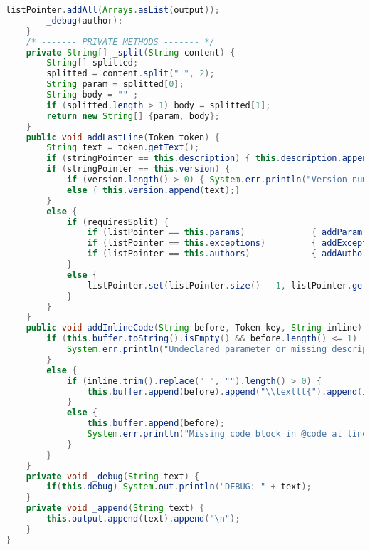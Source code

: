 \begin{lstlisting}[language=Java]
        listPointer.addAll(Arrays.asList(output));
        _debug(author);
    }
    /* ------- PRIVATE METHODS ------- */
    private String[] _split(String content) {
        String[] splitted;
        splitted = content.split(" ", 2);
        String param = splitted[0];
        String body = "" ;
        if (splitted.length > 1) body = splitted[1];
        return new String[] {param, body};
    }
    public void addLastLine(Token token) {
        String text = token.getText();
        if (stringPointer == this.description) { this.description.append(text); }
        if (stringPointer == this.version) {
            if (version.length() > 0) { System.err.println("Version number must be specified on a single line at line " + token.getLine()); }
            else { this.version.append(text);}
        }
        else {
            if (requiresSplit) {
                if (listPointer == this.params)             { addParam(text); }
                if (listPointer == this.exceptions)         { addException(text); }
                if (listPointer == this.authors)            { addAuthor(text); }
            }
            else {
                listPointer.set(listPointer.size() - 1, listPointer.get(listPointer.size() - 1).concat(" " + text));
            }
        }
    }
    public void addInlineCode(String before, Token key, String inline) {
        if (this.buffer.toString().isEmpty() && before.length() <= 1)  {
            System.err.println("Undeclared parameter or missing description at line " + key.getLine() + " before the inline code.");
        }
        else {
            if (inline.trim().replace(" ", "").length() > 0) {
                this.buffer.append(before).append("\\texttt{").append(inline).append("}");
            }
            else {
                this.buffer.append(before);
                System.err.println("Missing code block in @code at line " + key.getLine());
            }
        }
    }
    private void _debug(String text) {
        if(this.debug) System.out.println("DEBUG: " + text);
    }
    private void _append(String text) {
        this.output.append(text).append("\n");
    }
}
\end{lstlisting}
